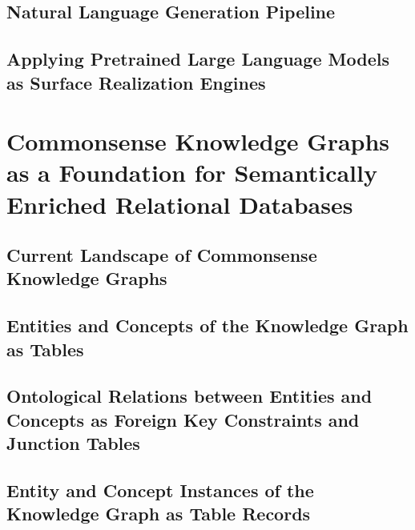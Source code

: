 \subsection{Natural Language Generation Pipeline}
\label{sec:nlp:transformer}


\subsection{Applying Pretrained Large Language Models as Surface Realization Engines}

\section{Commonsense Knowledge Graphs as a Foundation for Semantically Enriched Relational Databases}

\subsection{Current Landscape of Commonsense Knowledge Graphs}

\subsection{Entities and Concepts of the Knowledge Graph as Tables}

\subsection{Ontological Relations between Entities and Concepts as Foreign Key Constraints and Junction Tables}

\subsection{Entity and Concept Instances of the Knowledge Graph as Table Records}





